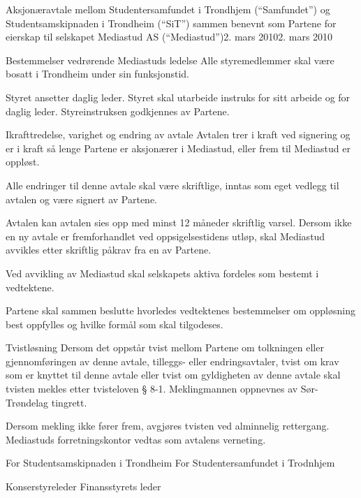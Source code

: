 \begin{instruks}{Aksjonæravtale mellom Studentersamfundet i Trondhjem
(``Samfundet'') og
Studentsamskipnaden i Trondheim (``SiT'') sammen benevnt som Partene for
eierskap til selskapet Mediastud AS (``Mediastud'')}{2. mars 2010}{2. mars 2010}
\begin{instruksledd}{Bestemmelser vedrørende Mediastuds ledelse}
		Alle styremedlemmer skal være bosatt i Trondheim under sin
		funksjonstid.

		Styret ansetter daglig leder. Styret skal utarbeide instruks for
		sitt arbeide og for daglig leder. Styreinstruksen godkjennes av
		Partene.
	\end{instruksledd}

	\begin{instruksledd}{Ikrafttredelse, varighet og endring av avtale}
	Avtalen trer i kraft ved signering og er i kraft så lenge Partene er aksjonærer
	i Mediastud, eller frem til Mediastud er oppløst. 

	Alle endringer til denne avtale skal være skriftlige, inntas som eget vedlegg
	til avtalen og være signert av Partene. 

	Avtalen kan avtalen sies opp med minst 12 måneder skriftlig varsel.
	Dersom ikke en ny avtale er fremforhandlet ved oppsigelsestidens utløp, skal
	Mediastud avvikles etter skriftlig påkrav fra en av Partene.

	Ved avvikling av Mediastud skal selskapets aktiva fordeles som bestemt i
	vedtektene.

	Partene skal sammen beslutte hvorledes vedtektenes bestemmelser om oppløsning
	best oppfylles og hvilke formål som skal tilgodeses.
	\end{instruksledd}

	\begin{instruksledd}{Tvistløsning}
	Dersom det oppstår tvist mellom Partene om tolkningen eller
	gjennomføringen av denne avtale, tilleggs- eller endringsavtaler, tvist
	om krav som er knyttet til denne avtale eller tvist om gyldigheten av
	denne avtale skal tvisten mekles etter tvisteloven § 8-1. Meklingmannen
	oppnevnes av Sør-Trøndelag tingrett.   

	Dersom mekling ikke fører frem, avgjøres tvisten ved alminnelig
	rettergang. Mediastuds forretningskontor vedtas som avtalens verneting.
	\end{instruksledd}

	\vfill
For Studentsamskipnaden i Trondheim 	\hfill	For Studentersamfundet i Trodnhjem

Konserstyreleder \hfill		Finansstyrets leder


\end{instruks}

